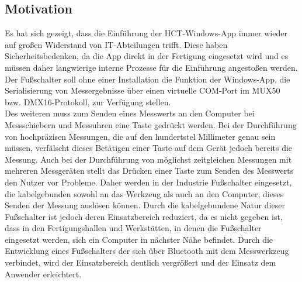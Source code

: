 \subsection{Motivation}
Es hat sich gezeigt, dass die Einführung der HCT-Windows-App immer wieder auf großen Widerstand von IT-Abteilungen trifft. Diese haben Sicherheitsbedenken, da die App direkt in der Fertigung eingesetzt wird und es müssen daher langwierige interne Prozesse für die Einführung angestoßen werden. Der Fußschalter soll ohne einer Installation die Funktion der Windows-App, die Serialisierung von Messergebnisse über einen virtuelle COM-Port im MUX50 bzw. DMX16-Protokoll, zur Verfügung stellen. \\
Des weiteren muss zum Senden eines Messwerts an den Computer bei Messschiebern und Messuhren eine Taste gedrückt werden. Bei der Durchführung von hochpräzisen Messungen, die auf den hundertstel Millimeter genau sein müssen, verfälscht dieses Betätigen einer Taste auf dem Gerät jedoch bereits die Messung. Auch bei der Durchführung von möglichst zeitgleichen Messungen mit mehreren Messgeräten stellt das Drücken einer Taste zum Senden des Messwerts den Nutzer vor Probleme. Daher werden in der Industrie Fußschalter eingesetzt, die kabelgebunden sowohl an das Werkzeug als auch an den Computer, dieses Senden der Messung auslösen können. Durch die kabelgebundene Natur dieser Fußschalter ist jedoch deren Einsatzbereich reduziert, da es nicht gegeben ist, dass in den Fertigungshallen und Werkstätten, in denen die Fußschalter eingesetzt werden, sich ein Computer in nächster Nähe befindet. Durch die Entwicklung eines Fußschalters der sich über Bluetooth mit dem Messwerkzeug verbindet, wird der Einsatzbereich deutlich vergrößert und der Einsatz dem Anwender erleichtert.